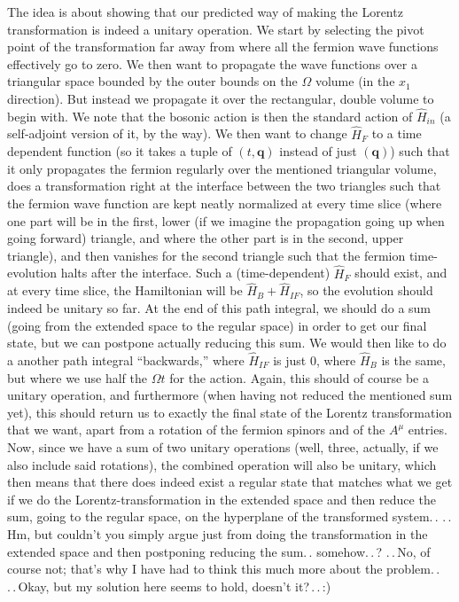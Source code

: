 \documentclass{report}
\begin{document}
The idea is about showing that our predicted way of making the Lorentz transformation is indeed a unitary operation. We start by selecting the pivot point of the transformation far away from where all the fermion wave functions effectively go to zero. We then want to propagate the wave functions over a triangular space bounded by the outer bounds on the $\Omega$ volume (in the $x_1$ direction). But instead we propagate it over the rectangular, double volume to begin with. We note that the bosonic action is then the standard action of $\hat H_{in}$ (a self-adjoint version of it, by the way). We then want to change $\hat H_F$ to a time dependent function (so it takes a tuple of $(t, \boldsymbol{q})$ instead of just $(\boldsymbol{q})$) such that it only propagates the fermion regularly over the mentioned triangular volume, does a transformation right at the interface between the two triangles such that the fermion wave function are kept neatly normalized at every time slice (where one part will be in the first, lower (if we imagine the propagation going up when going forward) triangle, and where the other part is in the second, upper triangle), and then vanishes for the second triangle such that the fermion time-evolution halts after the interface. Such a (time-dependent) $\hat H_F$ should exist, and at every time slice, the Hamiltonian will be $\hat H_B + \hat H_{IF}$, so the evolution should indeed be unitary so far. At the end of this path integral, we should do a sum (going from the extended space to the regular space) in order to get our final state, but we can postpone actually reducing this sum. We would then like to do a another path integral ``backwards,'' where $\hat H_{IF}$ is just 0, where $\hat H_B$ is the same, but where we use half the $\Omega t$ for the action. Again, this should of course be a unitary operation, and furthermore (when having not reduced the mentioned sum yet), this should return us to exactly the final state of the Lorentz transformation that we want, apart from a rotation of the fermion spinors and of the $A^\mu$ entries. %
Now, since we have a sum of two unitary operations (well, three, actually, if we also include said rotations), the combined operation will also be unitary, which then means that there does indeed exist a regular state that matches what we get if we do the Lorentz-transformation in the extended space and then reduce the sum, going to the regular space, on the hyperplane of the transformed system.\,. .\,.\,Hm, but couldn't you simply argue just from doing the transformation in the extended space and then postponing reducing the sum.\,. somehow.\,.\,? %
.\,.\,No, of course not; that's why I have had to think this much more about the problem.\,. %
.\,.\,Okay, but my solution here seems to hold, doesn't it?\,.\,.\,:)
\end{document}
